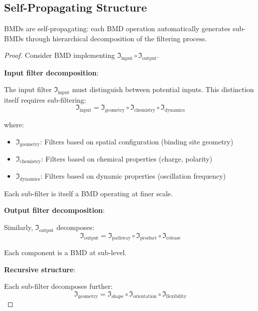 \subsection{Self-Propagating Structure}

\begin{theorem}
\label{thm:bmd_self_propagation}
BMDs are self-propagating: each BMD operation automatically generates sub-BMDs through hierarchical decomposition of the filtering process.
\end{theorem}

\begin{proof}
Consider BMD implementing $\Im_{\text{input}} \circ \Im_{\text{output}}$.

\textbf{Input filter decomposition}:

The input filter $\Im_{\text{input}}$ must distinguish between potential inputs. This distinction itself requires sub-filtering:
\begin{equation}
\Im_{\text{input}} = \Im_{\text{geometry}} \circ \Im_{\text{chemistry}} \circ \Im_{\text{dynamics}}
\end{equation}

where:
\begin{itemize}
\item $\Im_{\text{geometry}}$: Filters based on spatial configuration (binding site geometry)
\item $\Im_{\text{chemistry}}$: Filters based on chemical properties (charge, polarity)
\item $\Im_{\text{dynamics}}$: Filters based on dynamic properties (oscillation frequency)
\end{itemize}

Each sub-filter is itself a BMD operating at finer scale.

\textbf{Output filter decomposition}:

Similarly, $\Im_{\text{output}}$ decomposes:
\begin{equation}
\Im_{\text{output}} = \Im_{\text{pathway}} \circ \Im_{\text{product}} \circ \Im_{\text{release}}
\end{equation}

Each component is a BMD at sub-level.

\textbf{Recursive structure}:

Each sub-filter decomposes further:
\begin{equation}
\Im_{\text{geometry}} = \Im_{\text{shape}} \circ \Im_{\text{orientation}} \circ \Im_{\text{flexibility}}
\end{equation}


\end{proof}
